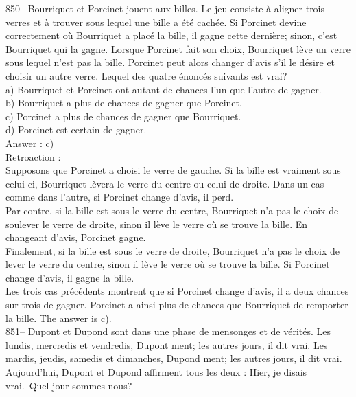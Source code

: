 ﻿\documentclass[letterpaper, 12pt]{article}
\begin{document}
850-- Bourriquet et Porcinet jouent aux billes.  Le jeu consiste \`a aligner
trois verres et \`a trouver sous lequel une bille a \'et\'e cach\'ee. Si
Porcinet devine correctement o\`u Bourriquet a plac\'e la bille, il gagne
cette derni\`ere; sinon, c'est Bourriquet qui la gagne.  Lorsque Porcinet
fait son choix, Bourriquet l\`eve un verre sous lequel n'est pas la bille.
Porcinet peut alors changer d'avis s'il le d\'esire et choisir un autre
verre.  Lequel des quatre \'enonc\'es suivants est vrai?\\
a) Bourriquet et Porcinet ont autant de chances l'un que l'autre de
gagner.\\
b) Bourriquet a plus de chances de gagner que Porcinet.\\
c) Porcinet a plus de chances de gagner que Bourriquet.\\
d) Porcinet est certain de gagner.\\

Answer : c)\\

Retroaction : \\
Supposons que Porcinet a choisi le verre de gauche. Si la bille est vraiment
sous celui-ci, Bourriquet l\`evera le verre du centre ou celui de droite.
Dans un cas comme dans l'autre, si Porcinet change d'avis, il perd.  \\
Par contre, si la bille est sous le verre du centre, Bourriquet n'a pas le
choix de soulever le verre de droite, sinon il l\`eve le verre o\`u se
trouve la bille.  En changeant d'avis, Porcinet gagne.\\
Finalement, si la bille est sous le verre de droite, Bourriquet n'a pas le
choix de lever le verre du centre, sinon il l\`eve le verre o\`u se trouve
la bille.  Si Porcinet change d'avis, il gagne la bille.\\
Les trois cas pr\'ec\'edents montrent que si Porcinet change d'avis, il a
deux chances sur trois de gagner.  Porcinet a ainsi plus de chances que
Bourriquet de remporter la bille.  The answer is c).\\

851-- Dupont et Dupond sont dans une phase de mensonges et de v\'erit\'es.
Les lundis, mercredis et vendredis, Dupont ment; les autres jours, il dit
vrai.  Les mardis, jeudis, samedis et dimanches, Dupond ment; les autres
jours, il dit vrai.  Aujourd'hui, Dupont et Dupond affirment tous les deux :
\og Hier, je disais vrai.\fg\  Quel jour sommes-nous?\\
\end{document}
